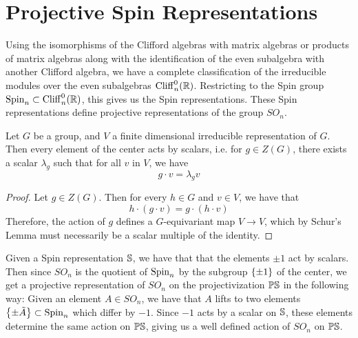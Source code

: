%
\section{Projective Spin Representations}
%
Using the isomorphisms of the Clifford algebras with matrix algebras
or products of matrix algebras along with the identification of the
even subalgebra with another Clifford algebra, we have a complete classification
of the irreducible modules over the even subalgebras $\Cliff^0_{n}(\R)$.
Restricting to the Spin group $\Spin_n \subset \Cliff^0_n(\R)$, this gives us
the Spin representations. These Spin representations define projective
representations of the group $SO_n$.
%
\begin{prop}
Let $G$ be a group, and $V$ a finite dimensional irreducible representation of $G$.
Then every element of the center acts by scalars, i.e. for $g \in Z(G)$, there
exists a scalar $\lambda_g$ such that for all $v$ in $V$, we have
\[
g \cdot v = \lambda_g v
\]
\end{prop}
%
\begin{proof}
Let $g \in Z(G)$. Then for every $h \in G$ and $v \in V$, we have that
\[
h \cdot (g\cdot v) = g \cdot (h\cdot v)
\]
Therefore, the action of $g$ defines a $G$-equivariant map $V \to V$, which
by Schur's Lemma must necessarily be a scalar multiple of the identity.
\end{proof}
%
Given a Spin representation $\S$, we have that that the elements
$\pm 1$ act by scalars. Then since $SO_n$ is the quotient of $\Spin_n$ by the
subgroup $\set{\pm 1}$ of the center, we get a projective representation of
$SO_n$ on the projectivization $\P\S$ in the following way:
Given an element $A \in SO_n$, we have that $A$ lifts to two elements
$\set{\pm \tilde{A}} \subset \Spin_n$ which differ by $-1$. Since $-1$
acts by a scalar on $\S$, these elements determine the same action on
$\P\S$, giving us a well defined action of $SO_n$ on $\P\S$.

